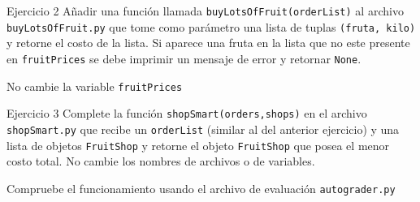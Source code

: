 \documentclass[10pt]{beamer}
\newcommand{\themename}{\textbf{\textsc{metropolis}}\xspace}
\begin{document}
\begin{frame}[fragile]{Ejercicio 2}
Añadir una función llamada \texttt{buyLotsOfFruit(orderList)} al archivo \texttt{buyLotsOfFruit.py}
que tome como parámetro una lista de tuplas \texttt{(fruta, kilo)} y retorne el costo 
de la lista. Si aparece una fruta en la lista que no este presente en \texttt{fruitPrices} se debe 
imprimir un mensaje de error y retornar \texttt{None}. 

No cambie la variable \texttt{fruitPrices}
\end{frame}

\begin{frame}[fragile]{Ejercicio 3}
Complete la función \texttt{shopSmart(orders,shops)} en el archivo \texttt{shopSmart.py}
que recibe un \texttt{orderList} (similar al del anterior ejercicio) y una lista 
de objetos \texttt{FruitShop} y retorne el objeto \texttt{FruitShop} que posea el menor costo 
total. No cambie los nombres de archivos o de variables.

Compruebe el funcionamiento usando el archivo de evaluación \texttt{autograder.py}

\end{frame}

\appendix



\end{document}
